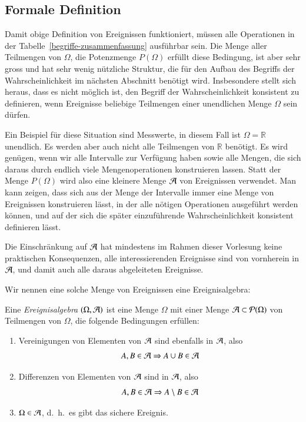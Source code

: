 \subsection{Formale Definition}
Damit obige Definition von Ereignissen funktioniert, müssen
alle Operationen in der Tabelle~\ref{begriffe-zusammenfassung}
ausführbar sein.
Die Menge aller Teilmengen von $\Omega$, die Potenzmenge
$P(\Omega)$ erfüllt diese Bedingung,
ist aber sehr gross und hat sehr wenig nützliche Struktur, die
für den Aufbau des Begriffs der Wahrscheinlichkeit im nächsten
Abschnitt benötigt wird.
Insbesondere stellt sich heraus, dass es nicht möglich ist,
den Begriff der Wahrscheinlichkeit konsistent zu definieren, wenn
Ereignisse beliebige Teilmengen einer unendlichen Menge $\Omega$
sein dürfen.

Ein Beispiel für diese Situation sind Messwerte, in diesem
Fall ist $\Omega=\mathbb R$ unendlich.
Es werden aber auch nicht alle Teilmengen von $\mathbb R$ benötigt.
Es wird genügen, wenn wir alle Intervalle zur Verfügung haben sowie
alle Mengen, die sich daraus durch endlich viele Mengenoperationen
konstruieren lassen.
Statt der Menge $P(\Omega)$ wird also eine kleinere Menge $\cal A$
von Ereignissen verwendet.
Man kann zeigen, dass sich aus der Menge der Intervalle immer 
eine Menge von Ereignissen konstruieren lässt, in der alle
nötigen Operationen ausgeführt werden können, und auf der sich
die später einzuführende Wahrscheinlichkeit konsistent definieren
lässt.

Die Einschränkung auf $\cal A$ hat mindestens im Rahmen dieser
Vorlesung keine praktischen Konsequenzen, alle interessierenden
Ereignisse sind von vornherein in $\cal A$, und damit auch alle daraus
abgeleiteten Ereignisse.

Wir nennen eine solche Menge von Ereignissen eine Ereignisalgebra:

\begin{definition}
\label{def-ereignisalgebra}
Eine {\em Ereignisalgebra} $(\Omega,{\cal A})$ ist
eine Menge $\Omega$ mit einer Menge ${\cal A }\subset{\cal P}(\Omega)$
von Teilmengen von $\Omega$, die folgende Bedingungen erfüllen:
\begin{enumerate}
\item Vereinigungen von Elementen von ${\cal A}$ sind ebenfalls in ${\cal A}$,
also
\[
A,B\in {\cal A}\Rightarrow A\cup B\in{\cal A}
\]
\item Differenzen von Elementen von ${\cal A}$ sind in ${\cal A}$, also
\[
A,B\in {\cal A}\Rightarrow A\setminus B\in{\cal A}
\]
\item $\Omega\in{\cal A}$, d.~h.~es gibt das sichere Ereignis.
\end{enumerate}
\end{definition}

